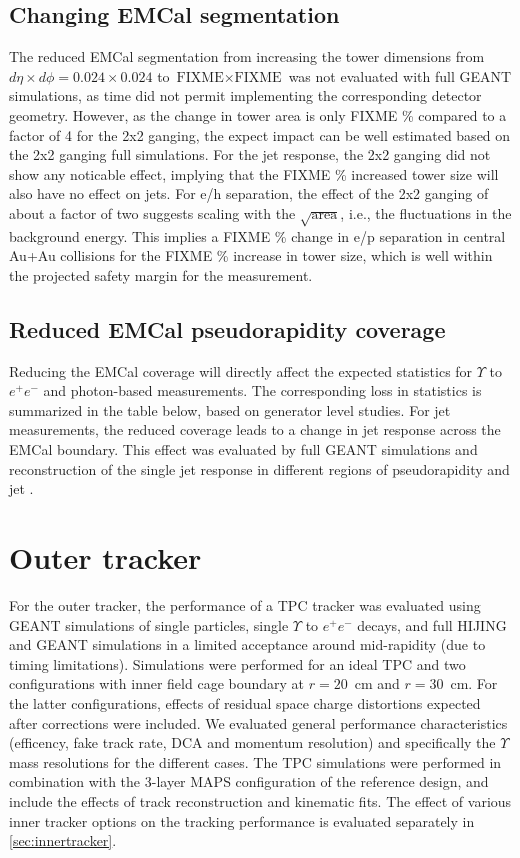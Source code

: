 \subsection{Changing EMCal segmentation}
The reduced EMCal segmentation from increasing the tower dimensions from $d\eta \times d\phi = 0.024 \times 0.024$ to 
$\mbox{FIXME} \times \mbox{FIXME}$ was not evaluated with full GEANT simulations, as time did not permit implementing
the corresponding detector geometry. However, as the change in tower area is only FIXME \% compared to a factor of 4 for 
the 2x2 ganging, the expect impact can be well estimated based on the 2x2 ganging full simulations. For the 
jet response, the 2x2 ganging did not show any noticable effect, implying that the FIXME \% increased tower size 
will also have no effect on jets. For e/h separation, the effect of the 2x2 ganging of about a factor of two suggests 
scaling with the $\sqrt{\mbox{area}}$, i.e., the fluctuations in the background energy. This implies a FIXME \% change
in e/p separation in central Au+Au collisions for the FIXME \% increase in tower size, which is well within the projected safety margin for the 
measurement.

\subsection{Reduced EMCal pseudorapidity coverage}
Reducing the EMCal coverage will directly affect the expected statistics for $\Upsilon$ to $e^+ e^-$ and photon-based measurements. The 
corresponding loss in statistics is summarized in the table below, based on generator level studies. For jet measurements, the reduced 
coverage leads to a change in jet response across the EMCal boundary. This effect was evaluated by full GEANT simulations and reconstruction
of the single jet response in different regions of pseudorapidity and jet \pt.

\section{Outer tracker}

For the outer tracker, the performance of a TPC tracker was evaluated using GEANT simulations of single particles, single $\Upsilon$ to $e^+ e^-$
decays, and full HIJING and GEANT simulations in a limited acceptance around mid-rapidity (due to timing limitations). Simulations were performed
for an ideal TPC and two configurations with inner field cage boundary at $r=20$~cm and $r=30$~cm. For the latter configurations, effects of 
residual space charge distortions expected after corrections were included. We evaluated general performance characteristics (efficency, fake track
rate, DCA and momentum resolution) and specifically the $\Upsilon$ mass resolutions for the different cases. The TPC simulations were performed
in combination with the 3-layer MAPS configuration of the reference design, and include the effects of track reconstruction and kinematic fits. 
The effect of various inner tracker options on the tracking performance is evaluated separately in \ref{sec:innertracker}.
